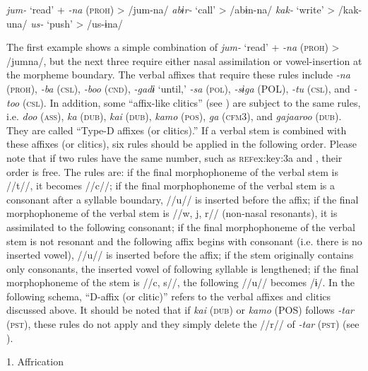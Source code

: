 \ea\label{ex:8-16}
    \ea \textit{jum-}  ‘read’  +  \textit{-na} (\textsc{proh})  >  /jum-na/
    \ex \textit{abɨr-}  ‘call’        >  /abɨn-na/
    \ex \textit{kak-}  ‘write’        >  /kak-una/
    \ex \textit{us-}  ‘push’        >  /us-ɨna/
    \z
\z

The first example shows a simple combination of \textit{jum-} ‘read’ + \textit{-na} (\textsc{proh}) > /jumna/, but the next three require either nasal assimilation or vowel-insertion at the morpheme boundary. The verbal affixes that require these rules include \textit{-na} (\textsc{proh}), \textit{-ba} (\textsc{csl}), \textit{-boo} (\textsc{cnd}), \textit{-gadɨ} ‘until,’ \textit{-sa} (\textsc{pol}), \textit{-sɨga} (POL), \textit{-tu} (\textsc{csl}), and \textit{-too} (\textsc{csl}). In addition, some “affix-like clitics” (see ) are subject to the same rules, i.e. \textit{doo} (\textsc{ass}), \textit{ka} (\textsc{dub}), \textit{kai} (\textsc{dub}), \textit{kamo} (\textsc{pos}), \textit{ga} (\textsc{cfm3}), and \textit{gajaaroo} (\textsc{dub}). They are called “Type-D affixes (or clitics).” If a verbal stem is combined with these affixes (or clitics), six rules should be applied in the following order. Please note that if two rules have the same number, such as \textsc{ref}{ex:key:3a} and , their order is free. The rules are:  if the final morphophoneme of the verbal stem is //t//, it becomes //c//;  if the final morphophoneme of the verbal stem is a consonant after a syllable boundary, //u// is inserted before the affix;  if the final morphophoneme of the verbal stem is //w, j, r// (non-nasal resonants), it is assimilated to the following consonant;  if the final morphophoneme of the verbal stem is not resonant and the following affix begins with consonant (i.e. there is no inserted vowel), //u// is inserted before the affix;  if the stem originally contains only consonants, the inserted vowel of following syllable is lengthened;  if the final morphophoneme of the stem is //c, s//, the following //u// becomes /ɨ/. In the following schema, “D-affix (or clitic)” refers to the verbal affixes and clitics discussed above. It should be noted that if \textit{kai} (\textsc{dub}) or \textit{kamo} (POS) follows \textit{-tar} (\textsc{pst}), these rules do not apply and they simply delete the //r// of \textit{-tar} (\textsc{pst}) (see ).

\ea\label{ex:8-17}
  1.  Affrication

